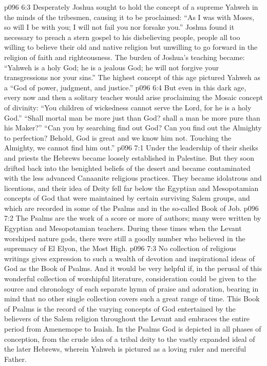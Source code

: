 \vs p096 6:3 Desperately Joshua sought to hold the concept of a supreme Yahweh in the minds of the tribesmen, causing it to be proclaimed: “As I was with Moses, so will I be with you; I will not fail you nor forsake you.” Joshua found it necessary to preach a stern gospel to his disbelieving people, people all too willing to believe their old and native religion but unwilling to go forward in the religion of faith and righteousness. The burden of Joshua’s teaching became: “Yahweh is a holy God; he is a jealous God; he will not forgive your transgressions nor your sins.” The highest concept of this age pictured Yahweh as a “God of power, judgment, and justice.”
\vs p096 6:4 But even in this dark age, every now and then a solitary teacher would arise proclaiming the Mosaic concept of divinity: “You children of wickedness cannot serve the Lord, for he is a holy God.” “Shall mortal man be more just than God? shall a man be more pure than his Maker?” “Can you by searching find out God? Can you find out the Almighty to perfection? Behold, God is great and we know him not. Touching the Almighty, we cannot find him out.”
\vs p096 7:1 Under the leadership of their sheiks and priests the Hebrews became loosely established in Palestine. But they soon drifted back into the benighted beliefs of the desert and became contaminated with the less advanced Canaanite religious practices. They became idolatrous and licentious, and their idea of Deity fell far below the Egyptian and Mesopotamian concepts of God that were maintained by certain surviving Salem groups, and which are recorded in some of the Psalms and in the so\hyp{}called Book of Job.
\pc \vs p096 7:2 The Psalms are the work of a score or more of authors; many were written by Egyptian and Mesopotamian teachers. During these times when the Levant worshiped nature gods, there were still a goodly number who believed in the supremacy of El Elyon, the Most High.
\vs p096 7:3 No collection of religious writings gives expression to such a wealth of devotion and inspirational ideas of God as the Book of Psalms. And it would be very helpful if, in the perusal of this wonderful collection of worshipful literature, consideration could be given to the source and chronology of each separate hymn of praise and adoration, bearing in mind that no other single collection covers such a great range of time. This Book of Psalms is the record of the varying concepts of God entertained by the believers of the Salem religion throughout the Levant and embraces the entire period from Amenemope to Isaiah. In the Psalms God is depicted in all phases of conception, from the crude idea of a tribal deity to the vastly expanded ideal of the later Hebrews, wherein Yahweh is pictured as a loving ruler and merciful Father.
